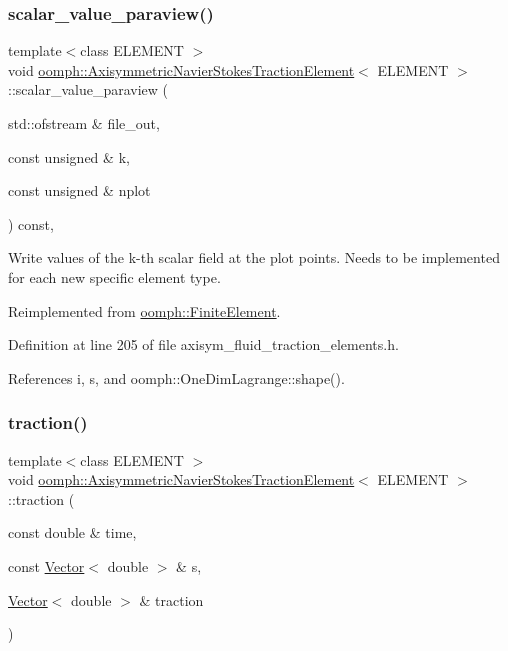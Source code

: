 \subsubsection{\texorpdfstring{scalar\+\_\+value\+\_\+paraview()}{scalar\_value\_paraview()}}
{\footnotesize\ttfamily template$<$class E\+L\+E\+M\+E\+NT $>$ \\
void \hyperlink{classoomph_1_1AxisymmetricNavierStokesTractionElement}{oomph\+::\+Axisymmetric\+Navier\+Stokes\+Traction\+Element}$<$ E\+L\+E\+M\+E\+NT $>$\+::scalar\+\_\+value\+\_\+paraview (\begin{DoxyParamCaption}\item[{std\+::ofstream \&}]{file\+\_\+out,  }\item[{const unsigned \&}]{k,  }\item[{const unsigned \&}]{nplot }\end{DoxyParamCaption}) const\hspace{0.3cm}{\ttfamily [inline]}, {\ttfamily [virtual]}}



Write values of the k-\/th scalar field at the plot points. Needs to be implemented for each new specific element type. 



Reimplemented from \hyperlink{classoomph_1_1FiniteElement_a02cf8832a5e2886f1572bd36f7a7c1e3}{oomph\+::\+Finite\+Element}.



Definition at line 205 of file axisym\+\_\+fluid\+\_\+traction\+\_\+elements.\+h.



References i, s, and oomph\+::\+One\+Dim\+Lagrange\+::shape().

\mbox{\label{classoomph_1_1AxisymmetricNavierStokesTractionElement_a467d411cab5179a2437fa762a0df2a02}} 
\subsubsection{\texorpdfstring{traction()}{traction()}}
{\footnotesize\ttfamily template$<$class E\+L\+E\+M\+E\+NT $>$ \\
void \hyperlink{classoomph_1_1AxisymmetricNavierStokesTractionElement}{oomph\+::\+Axisymmetric\+Navier\+Stokes\+Traction\+Element}$<$ E\+L\+E\+M\+E\+NT $>$\+::traction (\begin{DoxyParamCaption}\item[{const double \&}]{time,  }\item[{const \hyperlink{classoomph_1_1Vector}{Vector}$<$ double $>$ \&}]{s,  }\item[{\hyperlink{classoomph_1_1Vector}{Vector}$<$ double $>$ \&}]{traction }\end{DoxyParamCaption})}



